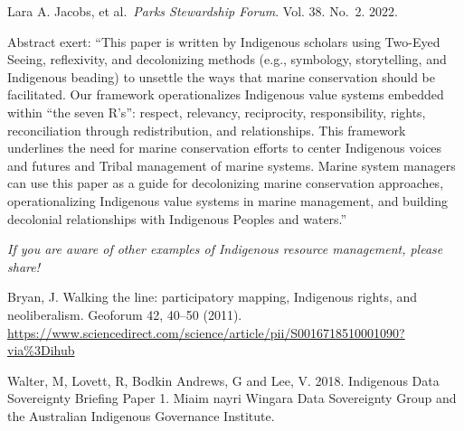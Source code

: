 \documentclass[
]{book}
\begin{document}
Lara A. Jacobs, et al.~\emph{Parks Stewardship Forum}. Vol. 38. No.~2. 2022.

Abstract exert: ``This paper is written by Indigenous scholars using Two-Eyed Seeing, reflexivity, and decolonizing methods (e.g., symbology, storytelling, and Indigenous beading) to unsettle the ways that marine conservation should be facilitated. Our framework operationalizes Indigenous value systems embedded within ``the seven R's'': respect, relevancy, reciprocity, responsibility, rights, reconciliation through redistribution, and relationships. This framework underlines the need for marine conservation efforts to center Indigenous voices and futures and Tribal management of marine systems. Marine system managers can use this paper as a guide for decolonizing marine conservation approaches, operationalizing Indigenous value systems in marine management, and building decolonial relationships with Indigenous Peoples and waters.''

\emph{If you are aware of other examples of Indigenous resource management, please share!}

Bryan, J. Walking the line: participatory mapping, Indigenous rights, and neoliberalism. Geoforum 42, 40--50 (2011). \url{https://www.sciencedirect.com/science/article/pii/S0016718510001090?via\%3Dihub}

Walter, M, Lovett, R, Bodkin Andrews, G and Lee, V. 2018. Indigenous Data Sovereignty Briefing Paper 1. Miaim nayri Wingara Data Sovereignty Group and the Australian Indigenous Governance Institute.
\end{document}
